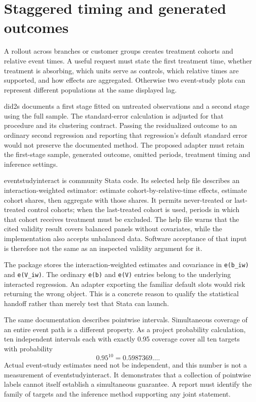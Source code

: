 \section{Staggered timing and generated outcomes}

A rollout across branches or customer groups creates treatment cohorts and
relative event times. A useful request must state the first treatment time,
whether treatment is absorbing, which units serve as controls, which relative
times are supported, and how effects are aggregated. Otherwise two event-study
plots can represent different populations at the same displayed lag.

did2s documents a first stage fitted on untreated observations and a second
stage using the full sample. The standard-error calculation is adjusted for
that procedure and its clustering contract. Passing the residualized outcome
to an ordinary second regression and reporting that regression's default
standard error would not preserve the documented method. The proposed adapter
must retain the first-stage sample, generated outcome, omitted periods,
treatment timing and inference settings. \cite{v12_sw_did2s}

eventstudyinteract is community Stata code. Its selected help file describes
an interaction-weighted estimator: estimate cohort-by-relative-time effects,
estimate cohort shares, then aggregate with those shares. It permits
never-treated or last-treated control cohorts; when the last-treated cohort
is used, periods in which that cohort receives treatment must be excluded.
The help file warns that the cited validity result covers balanced panels
without covariates, while the implementation also accepts unbalanced data.
Software acceptance of that input is therefore not the same as an inspected
validity argument for it. \cite{v12_sw_eventstudyinteract}

The package stores the interaction-weighted estimates and covariance in
\texttt{e(b\_iw)} and \texttt{e(V\_iw)}. The ordinary \texttt{e(b)} and
\texttt{e(V)} entries belong to the underlying interacted regression. An
adapter exporting the familiar default slots would risk returning the wrong
object. This is a concrete reason to qualify the statistical handoff rather
than merely test that Stata can launch.

The same documentation describes pointwise intervals. Simultaneous coverage
of an entire event path is a different property. As a project probability
calculation, ten independent intervals each with exactly 0.95 coverage cover
all ten targets with probability
\[
 0.95^{10}=0.5987369\ldots.
\]
Actual event-study estimates need not be independent, and this number is not
a measurement of eventstudyinteract. It demonstrates that a collection of
pointwise labels cannot itself establish a simultaneous guarantee. A report
must identify the family of targets and the inference method supporting any
joint statement.

